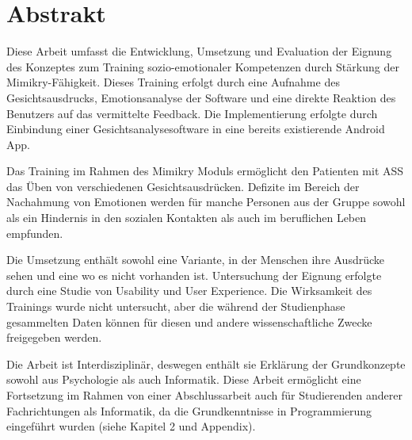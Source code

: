 \pagebreak
\thispagestyle{empty}
\section*{Abstrakt}
Diese Arbeit umfasst die Entwicklung, Umsetzung und Evaluation der Eignung des Konzeptes zum Training sozio-emotionaler Kompetenzen durch Stärkung der Mimikry-Fähigkeit. Dieses Training erfolgt durch eine Aufnahme des Gesichtsausdrucks, Emotionsanalyse der Software und eine direkte Reaktion des Benutzers auf das vermittelte Feedback. Die Implementierung erfolgte durch Einbindung einer Gesichtsanalysesoftware in eine bereits existierende Android App.

Das Training im Rahmen des Mimikry Moduls ermöglicht den Patienten mit ASS das Üben von verschiedenen Gesichtsausdrücken. Defizite im Bereich der Nachahmung von Emotionen werden für manche Personen aus der Gruppe sowohl als ein Hindernis in den sozialen Kontakten als auch im beruflichen Leben empfunden.

Die Umsetzung enthält sowohl eine Variante, in der Menschen ihre Ausdrücke sehen und eine wo es nicht vorhanden ist. Untersuchung der Eignung erfolgte durch eine Studie von Usability und User Experience. Die Wirksamkeit des Trainings wurde nicht untersucht, aber die während der Studienphase gesammelten Daten können für diesen und andere wissenschaftliche Zwecke freigegeben werden. 

Die Arbeit ist Interdisziplinär, deswegen enthält sie Erklärung der Grundkonzepte sowohl aus Psychologie als auch Informatik. Diese Arbeit ermöglicht eine Fortsetzung im Rahmen von einer Abschlussarbeit auch für Studierenden anderer Fachrichtungen als Informatik, da die Grundkenntnisse in Programmierung eingeführt wurden (siehe Kapitel 2 und Appendix).  